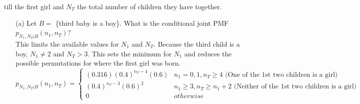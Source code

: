 \documentclass{report}
\begin{document}
\begin{enumerate}
till the first girl and $N_T$ the total number of children they have together.
\begin{itemize}
  \item[(a)] Let $B=$ \{third baby is a boy\}. What is the conditional joint PMF $p_{N_1, N_T|B}(n_1,n_T)$?\\
This limits the available values for $N_1$ and $N_T$. Because the third child is a boy, $N_1 \neq 2$ and $N_T > 3$. This sets the minimum for $N_1$ and reduces the possible permutations for where the first girl was born.\\
$$p_{N_1, N_T|B}(n_1,n_T) = \left. \begin{cases}
(0.316)(0.4)^{n_T - 4}(0.6) & n_1 = 0,1,  n_T \geq 4  \text{ (One of the 1st two children is a girl)} \\
(0.4)^{n_T - 3}(0.6)^2 & n_1 \geq 3,  n_T \geq n_1 + 2  \text{ (Neither of the 1st two children is a girl)} \\
0 & otherwise
\end{cases} \right.$$
\end{itemize}

\end{enumerate}

 
\end{document}
